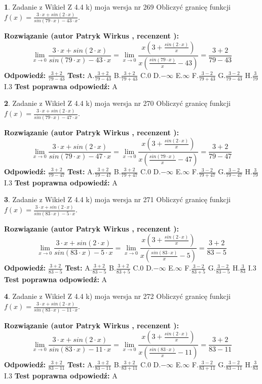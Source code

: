 \documentclass[12pt, a4paper]{article}
\theoremstyle{definition} %
\newtheorem{zad}{}
\newcommand{\zadStart}[1]{\begin{zad}#1\newline}
\newcommand{\zadStop}{\end{zad}}
\newcommand{\rozwStart}[2]{\noindent \textbf{Rozwiązanie (autor #1 , recenzent #2): }\newline}
\newcommand{\rozwStop}{\newline}
\newcommand{\odpStart}{\noindent \textbf{Odpowiedź:}\newline}
\newcommand{\odpStop}{\newline}
\newcommand{\testStart}{\noindent \textbf{Test:}\newline}
\newcommand{\testStop}{\newline}
\newcommand{\kluczStart}{\noindent \textbf{Test poprawna odpowiedź:}\newline}
\newcommand{\kluczStop}{\newline}
\begin{document}
\zadStart{Zadanie z Wikieł Z 4.4 k) moja wersja nr 269}
Obliczyć granicę funkcji $f(x)=\frac{3\cdot x +sin(2\cdot x)}{sin(79\cdot x) -43\cdot x}$.
\zadStop
\rozwStart{Patryk Wirkus}{}
$$\lim\limits_{x\to 0}\frac{3\cdot x +sin(2\cdot x)}{sin(79\cdot x) -43\cdot x}
=\lim\limits_{x\to 0}\frac{x(3+\frac{sin(2\cdot x)}{x})}{x(\frac{sin(79\cdot x)}{x}-43)}
=\frac{3+2}{79-43}$$
\rozwStop
\odpStart
$\frac{3+2}{79-43}$
\odpStop
\testStart
A.$\frac{3+2}{79-43}$
B.$\frac{3+2}{79+43}$
C.$0$
D.$-\infty$
E.$\infty$
F.$\frac{3-2}{79+43}$
G.$\frac{3-2}{79-43}$
H.$\frac{3}{79}$
I.$3$
\testStop
\kluczStart
A
\kluczStop



\zadStart{Zadanie z Wikieł Z 4.4 k) moja wersja nr 270}
Obliczyć granicę funkcji $f(x)=\frac{3\cdot x +sin(2\cdot x)}{sin(79\cdot x) -47\cdot x}$.
\zadStop
\rozwStart{Patryk Wirkus}{}
$$\lim\limits_{x\to 0}\frac{3\cdot x +sin(2\cdot x)}{sin(79\cdot x) -47\cdot x}
=\lim\limits_{x\to 0}\frac{x(3+\frac{sin(2\cdot x)}{x})}{x(\frac{sin(79\cdot x)}{x}-47)}
=\frac{3+2}{79-47}$$
\rozwStop
\odpStart
$\frac{3+2}{79-47}$
\odpStop
\testStart
A.$\frac{3+2}{79-47}$
B.$\frac{3+2}{79+47}$
C.$0$
D.$-\infty$
E.$\infty$
F.$\frac{3-2}{79+47}$
G.$\frac{3-2}{79-47}$
H.$\frac{3}{79}$
I.$3$
\testStop
\kluczStart
A
\kluczStop



\zadStart{Zadanie z Wikieł Z 4.4 k) moja wersja nr 271}
Obliczyć granicę funkcji $f(x)=\frac{3\cdot x +sin(2\cdot x)}{sin(83\cdot x) -5\cdot x}$.
\zadStop
\rozwStart{Patryk Wirkus}{}
$$\lim\limits_{x\to 0}\frac{3\cdot x +sin(2\cdot x)}{sin(83\cdot x) -5\cdot x}
=\lim\limits_{x\to 0}\frac{x(3+\frac{sin(2\cdot x)}{x})}{x(\frac{sin(83\cdot x)}{x}-5)}
=\frac{3+2}{83-5}$$
\rozwStop
\odpStart
$\frac{3+2}{83-5}$
\odpStop
\testStart
A.$\frac{3+2}{83-5}$
B.$\frac{3+2}{83+5}$
C.$0$
D.$-\infty$
E.$\infty$
F.$\frac{3-2}{83+5}$
G.$\frac{3-2}{83-5}$
H.$\frac{3}{83}$
I.$3$
\testStop
\kluczStart
A
\kluczStop



\zadStart{Zadanie z Wikieł Z 4.4 k) moja wersja nr 272}
Obliczyć granicę funkcji $f(x)=\frac{3\cdot x +sin(2\cdot x)}{sin(83\cdot x) -11\cdot x}$.
\zadStop
\rozwStart{Patryk Wirkus}{}
$$\lim\limits_{x\to 0}\frac{3\cdot x +sin(2\cdot x)}{sin(83\cdot x) -11\cdot x}
=\lim\limits_{x\to 0}\frac{x(3+\frac{sin(2\cdot x)}{x})}{x(\frac{sin(83\cdot x)}{x}-11)}
=\frac{3+2}{83-11}$$
\rozwStop
\odpStart
$\frac{3+2}{83-11}$
\odpStop
\testStart
A.$\frac{3+2}{83-11}$
B.$\frac{3+2}{83+11}$
C.$0$
D.$-\infty$
E.$\infty$
F.$\frac{3-2}{83+11}$
G.$\frac{3-2}{83-11}$
H.$\frac{3}{83}$
I.$3$
\testStop
\kluczStart
A
\kluczStop
\end{document}
